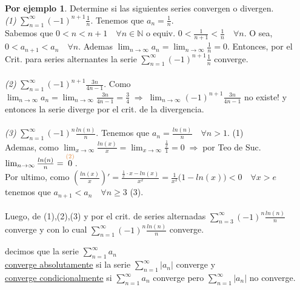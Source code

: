 \documentclass{article}
\theoremstyle{definition}
\newtheorem*{ej}{Por ejemplo}
\theoremstyle{remark}
\begin{document}
\begin{ej}
  Determine si las siguientes series convergen o divergen. \\
  \emph{(1)} \quad $\sum_{n=1}^{\infty}{(-1)^{n+1}\frac{1}{n}}$. Tenemos que $a_n=\frac{1}{n}$. \\
  Sabemos que $0<n<n+1 \quad \forall n \in \mathbb{N}$ o equiv. $0<\frac{1}{n+1}<\frac{1}{n} \quad \forall n$. O sea, $0<a_{n+1}<a_n \quad \forall n$. Ademas $\lim_{n \to \infty}{a_n}=\lim_{n\to\infty}{\frac{1}{n}}=0.$ Entonces, por el Crit. para series alternantes la serie $\sum_{n=1}^{\infty}{(-1)^{n+1}\frac{1}{n}}$ converge. \\ \\

  \emph{(2)} \quad $\sum_{n=1}^{\infty}{(-1)^{n+1}{\frac{3n}{4n-1}}}$. Como $\lim_{n\to\infty}{a_n}=\lim_{n\to\infty}{\frac{3n}{4n-1}}=\frac{3}{4} \; \Rightarrow \; \lim_{n\to\infty}{(-1)^{n+1}\frac{3n}{4n-1}}$ no existe! y entonces la serie diverge por el crit. de la divergencia.
\\
\\
\emph{(3)} \quad $\sum_{n=1}^{\infty}{(-1)^{n}\frac{ln(n)}{n}}$. Tenemos que $a_n=\frac{ln(n)}{n}\quad \forall n > 1$. \textcolor{rojop2}{(1)} \\
Ademas, como $\lim_{x \to \infty}{\frac{ln(x)}{x}}=\lim_{x\to\infty}{\frac{\frac{1}{x}}{1}}=0 \; \Rightarrow \; $por Teo de Suc. $\lim_{n \to \infty}{\frac{ln(n)}{n}}=\overset{\textcolor{rojop2}{(2)}}{0}$.  \\
Por ultimo, como $\left(\frac{ln(x)}{x}\right)'=\frac{\frac{1}{x}\cdot x -ln(x)}{x^2}=\frac{1}{x^2}\big(1-ln(x)\big)<0 \quad \forall x >e$ \\
tenemos que $a_{n+1}<a_n \quad \forall n \geq 3$ \textcolor{rojop2}{(3)}. \\\\
Luego, de \textcolor{rojop2}{(1)},\textcolor{rojop2}{(2)},\textcolor{rojop2}{(3)} y por el crit. de series alternadas $\sum_{n=3}^{\infty}{(-1)^{n}\frac{ln(n)}{n}}$ converge y con lo cual $\sum_{n=1}^{\infty}{(-1)^{n}\frac{ln(n)}{n}}$ converge. 
\end{ej}

\begin{defi}
  decimos que la serie $\sum_{n=1}^{\infty}{a_n}$ \\
  \underline{converge absolutamente} si la serie $\sum_{n=1}^{\infty}{|a_n|}$ converge y \\
  \underline{converge condicionalmente} si $\sum_{n=1}^{\infty}{a_n}$ converge pero $\sum_{n=1}^{\infty}{|a_n|}$ no converge.
\end{defi}
\end{document}
